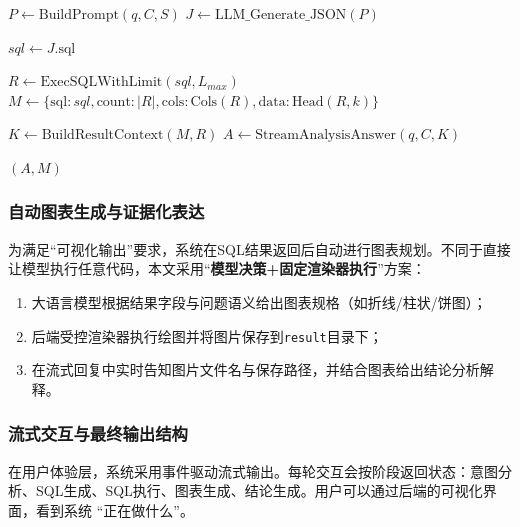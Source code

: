 \documentclass[withoutpreface,bwprint]{cumcmthesis} %
\begin{document}
\begin{algorithm}[htbp]
	\caption{NL2SQL 生成与执行主流程}
	\SetInd{0.5em}{1em} %

	\BlankLine %


	$P \leftarrow \text{BuildPrompt}(q, C, S)$\;
	$J \leftarrow \text{LLM\_Generate\_JSON}(P)$\;


	$sql \leftarrow J.\text{sql}$\;

	$R \leftarrow \text{ExecSQLWithLimit}(sql, L_{max})$\;
	$M \leftarrow \{ \text{sql}: sql, \text{count}: |R|, \text{cols}: \text{Cols}(R), \text{data}: \text{Head}(R, k) \}$\;

	$K \leftarrow \text{BuildResultContext}(M, R)$\;
	$A \leftarrow \text{StreamAnalysisAnswer}(q, C, K)$\;

	\Return $(A, M)$\;
\end{algorithm}

\subsubsection{自动图表生成与证据化表达}
为满足“可视化输出”要求，系统在SQL结果返回后自动进行图表规划。不同于直接让模型执行任意代码，本文采用“\textbf{模型决策+固定渲染器执行}”方案：
\begin{enumerate}
	\item 大语言模型根据结果字段与问题语义给出图表规格（如折线/柱状/饼图）；
	\item 后端受控渲染器执行绘图并将图片保存到\texttt{result}目录下；
	\item 在流式回复中实时告知图片文件名与保存路径，并结合图表给出结论分析解释。
\end{enumerate}
\subsubsection{流式交互与最终输出结构}
在用户体验层，系统采用事件驱动流式输出。每轮交互会按阶段返回状态：意图分析、SQL生成、SQL执行、图表生成、结论生成。用户可以通过后端的可视化界面，看到系统
“正在做什么”。
\end{document}
